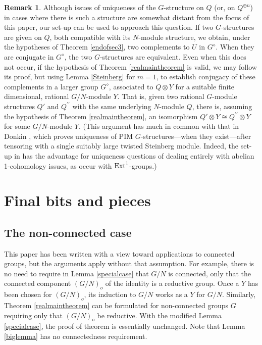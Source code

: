 \documentclass[11pt,leqno,amscd,amssymb,verbatim, url]{amsart}
\theoremstyle{definition}
\newtheorem{rem}[thm]{Remark}
\numberwithin{equation}{thm}
\newcommand{\Ext}{{\text{\rm Ext}}}
\begin{document}
\begin{rem}\label{uniqueness} Although issues of uniqueness of the $G$-structure on $Q$ (or, on $Q^{\oplus n}$) in cases where there is such a structure are somewhat distant from the focus of this paper, our set-up can
be used to approach this question. If two $G$-structures are given on $Q$, both compatible with its $N$-module
structure, we obtain, under the hypotheses of Theorem \ref{endofsec3}, two complements to $U$ in $G^\diamond$. When
they are conjugate in $G^\diamond$, the two $G$-structures are equivalent. Even when this does not occur, if the hypothesis of
   Theorem \ref{realmaintheorem} is valid, we may follow its proof, but using Lemma \ref{Steinberg} for 
   $m=1$, to establish conjugacy of these complements in
   a larger group $G^\diamond$, associated to $Q\otimes Y$ for a suitable finite dimensional, rational $G/N$-module $Y$.  That is, given two rational $G$-module
   structures $Q'$ and $Q^{\prime\prime}$ with the same underlying $N$-module $Q$, there is, assuming the hypothesis of
   Theorem \ref{realmaintheorem}, an isomorphism $Q'\otimes Y\cong Q^{\prime\prime}\otimes Y$ for some $G/N$-module $Y$.
     (This argument has much in common with that  in Donkin
\cite{Donkin},
which proves uniqueness of PIM $G$-structures---when they exist---after tensoring with a single suitably large twisted Steinberg module. Indeed, the set-up in \cite {Donkin} has the advantage for uniqueness questions of dealing entirely with abelian 1-cohomology issues, as occur with $\Ext^1$-groups.)\end{rem}

\section{Final bits and pieces}

\subsection{The non-connected case} This paper has been written with a view toward applications to connected
groups, but the arguments apply without that assumption. For example, there is no need to require in Lemma \ref{specialcase}
that $G/N$ is connected, only that the connected component $(G/N)_o$ of the identity is a reductive group. Once a $Y$ has
been chosen for $(G/N)_o$, its induction to $G/N$ works as a $Y$ for $G/N$. Similarly, Theorem \ref{realmaintheorem} can
be formulated for non-connected groups $G$ requiring only that $(G/N)_o$ be reductive. With the modified Lemma \ref{specialcase},
the proof of theorem is essentially unchanged. Note that Lemma \ref{biglemma} has no connectedness requirement.
\end{document}
